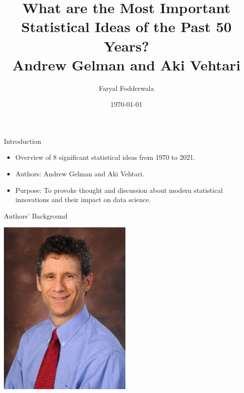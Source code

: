 \documentclass{beamer}
\title{What are the Most Important Statistical Ideas of the Past 50 Years?\\
\vspace{0.5em}
\small Andrew Gelman and Aki Vehtari}
\author{Faryal Fodderwala}
\date{\today}
\begin{document}
\frame{\titlepage}

\begin{frame}{Introduction}
\begin{itemize}
    \item Overview of 8 significant statistical ideas from 1970 to 2021.
    \item Authors: Andrew Gelman and Aki Vehtari.
    \item Purpose: To provoke thought and discussion about modern statistical innovations and their impact on data science.
\end{itemize}
\end{frame}

\begin{frame}{Authors' Background}
\begin{minipage}{0.3\textwidth}
    \includegraphics[width=\textwidth]{andrew_gelman.png} %

\end{minipage}
\end{frame}
\end{document}
